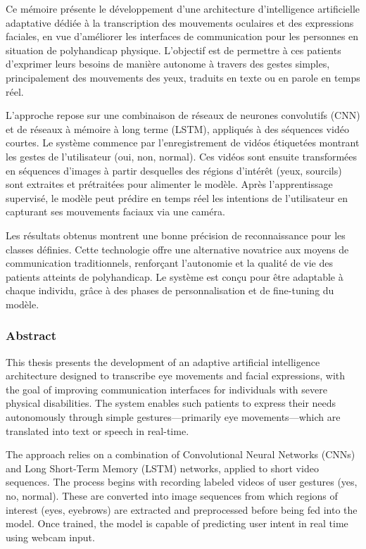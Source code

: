 \documentclass[
]{article}
\begin{document}
Ce mémoire présente le développement d'une architecture d'intelligence artificielle adaptative dédiée à la transcription des mouvements oculaires et des expressions faciales, en vue d'améliorer les interfaces de communication pour les personnes en situation de polyhandicap physique. L'objectif est de permettre à ces patients d'exprimer leurs besoins de manière autonome à travers des gestes simples, principalement des mouvements des yeux, traduits en texte ou en parole en temps réel.

L'approche repose sur une combinaison de réseaux de neurones convolutifs (CNN) et de réseaux à mémoire à long terme (LSTM), appliqués à des séquences vidéo courtes. Le système commence par l'enregistrement de vidéos étiquetées montrant les gestes de l'utilisateur (oui, non, normal). Ces vidéos sont ensuite transformées en séquences d'images à partir desquelles des régions d'intérêt (yeux, sourcils) sont extraites et prétraitées pour alimenter le modèle. Après l'apprentissage supervisé, le modèle peut prédire en temps réel les intentions de l'utilisateur en capturant ses mouvements faciaux via une caméra.

Les résultats obtenus montrent une bonne précision de reconnaissance pour les classes définies. Cette technologie offre une alternative novatrice aux moyens de communication traditionnels, renforçant l'autonomie et la qualité de vie des patients atteints de polyhandicap. Le système est conçu pour être adaptable à chaque individu, grâce à des phases de personnalisation et de fine-tuning du modèle.

\hypertarget{abstract}{%
\subsubsection{Abstract}\label{abstract}}

This thesis presents the development of an adaptive artificial intelligence architecture designed to transcribe eye movements and facial expressions, with the goal of improving communication interfaces for individuals with severe physical disabilities. The system enables such patients to express their needs autonomously through simple gestures---primarily eye movements---which are translated into text or speech in real-time.

The approach relies on a combination of Convolutional Neural Networks (CNNs) and Long Short-Term Memory (LSTM) networks, applied to short video sequences. The process begins with recording labeled videos of user gestures (yes, no, normal). These are converted into image sequences from which regions of interest (eyes, eyebrows) are extracted and preprocessed before being fed into the model. Once trained, the model is capable of predicting user intent in real time using webcam input.
\end{document}
